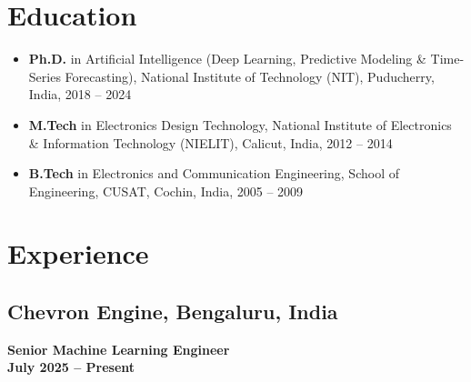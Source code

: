 \documentclass[a4paper,10pt]{article}
\begin{document}
	\section{Education}
	\begin{itemize}
		\item \textbf{Ph.D.} in Artificial Intelligence (Deep Learning, Predictive Modeling \& Time-Series Forecasting), National Institute of Technology (NIT), Puducherry, India, 2018 -- 2024
		\item \textbf{M.Tech} in Electronics Design Technology, National Institute of Electronics \& Information Technology (NIELIT), Calicut, India, 2012 -- 2014
		\item \textbf{B.Tech} in Electronics and Communication Engineering, School of Engineering, CUSAT, Cochin, India, 2005 -- 2009
	\end{itemize}
	
	\section{Experience}
	
\subsection{Chevron Engine, Bengaluru, India} 
\textbf{Senior Machine Learning Engineer} \\
\hfill \textbf{July 2025 -- Present} 
\end{document}
